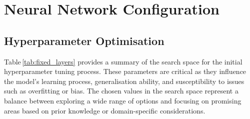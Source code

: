 \chapter{Neural Network Configuration}
\label{chapter:hyper}
\section{Hyperparameter Optimisation}





Table\,\ref{tab:fixed_layers} provides a summary of the search space for the initial hyperparameter tuning process. These parameters are critical as they influence the model's learning process, generalisation ability, and susceptibility to issues such as overfitting or bias. The chosen values in the search space represent a balance between exploring a wide range of options and focusing on promising areas based on prior knowledge or domain-specific considerations.

